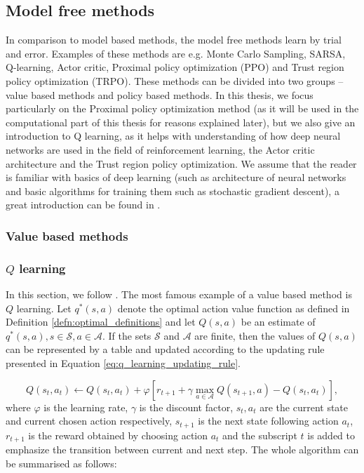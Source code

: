 \subsection{Model free methods}
In comparison to model based methods, the model free methods learn by trial and error.
Examples of these methods are e.g. Monte Carlo Sampling, SARSA, Q-learning, Actor critic, Proximal policy optimization (PPO) and Trust region policy optimization (TRPO). These methods can be divided into two groups -- value based methods and policy based methods. In this thesis, we focus particularly on the Proximal policy optimization method (as it will be used in the computational part of this thesis for reasons explained later), but we also give an introduction to Q learning, as it helps with understanding of how deep neural networks are used in the field of reinforcement learning, the Actor critic architecture and the Trust region policy optimization. We assume that the reader is familiar with basics of deep learning (such as architecture of neural networks and basic algorithms for training them such as stochastic gradient descent), a great introduction can be found in \cite[Part 2]{deep_learning_book}.
\subsubsection{Value based methods}
\subsubsection{$Q$ learning}
In this section, we follow \cite[Section 6.5.]{sutton2018reinforcement}.
The most famous example of a value based method is $Q$ learning.
Let $q^*(s,a)$ denote the optimal action value function as defined in Definition \ref{defn:optimal_definitions} and let $Q(s,a)$ be an estimate of $q^*(s,a), s \in \mathcal{S}, a \in \mathcal{A}$. If the sets $\mathcal{S}$ and $\mathcal{A}$ are finite, then the values of $Q(s,a)$ can be represented by a table and updated according to the updating rule presented in Equation \ref{eq:q_learning_updating_rule}.

\begin{equation}
Q(s_t, a_t) \leftarrow Q(s_t, a_t) + \varphi \left[r_{t+1} + \gamma \underset{a \in \mathcal{A}}{\max}Q(s_{t+1}, a) - Q(s_t, a_t) \right],
\label{eq:q_learning_updating_rule}
\end{equation}
where $\varphi$ is the learning rate, $\gamma$ is the discount factor, $s_t, a_t$ are the current state and current chosen action respectively, $s_{t+1}$ is the next state following action $a_t$, $r_{t+1}$ is the reward obtained by choosing action $a_t$ and the subscript $t$ is added to emphasize the transition between current and next step.
The whole algorithm can be summarised as follows:

